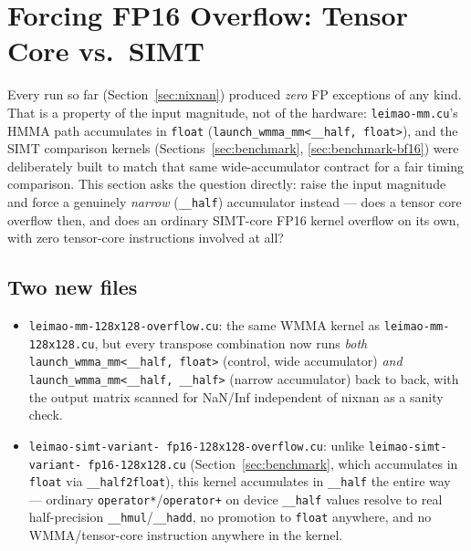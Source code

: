 \documentclass[11pt]{article}
\begin{document}
\section{Forcing FP16 Overflow: Tensor Core vs.\ SIMT}
\label{sec:overflow}

Every run so far (Section~\ref{sec:nixnan}) produced \emph{zero} FP exceptions
of any kind. That is a property of the input magnitude, not of the
hardware: \texttt{leimao-mm.cu}'s HMMA path accumulates in \texttt{float}
(\texttt{launch\_wmma\_mm<\_\_half, float>}), and the SIMT comparison kernels
(Sections~\ref{sec:benchmark}, \ref{sec:benchmark-bf16}) were deliberately
built to match that same wide-accumulator contract for a fair timing
comparison. This section asks the question directly: raise the input
magnitude and force a genuinely \emph{narrow} (\texttt{\_\_half}) accumulator
instead --- does a tensor core overflow then, and does an ordinary SIMT-core
FP16 kernel overflow on its own, with zero tensor-core instructions
involved at all?

\subsection{Two new files}

\begin{itemize}
  \item \texttt{leimao-mm-128x128-overflow.cu}: the same WMMA kernel as
    \texttt{leimao-mm-128x128.cu}, but every transpose combination now runs
    \emph{both} \texttt{launch\_wmma\_mm<\_\_half, float>} (control, wide
    accumulator) \emph{and} \texttt{launch\_wmma\_mm<\_\_half, \_\_half>}
    (narrow accumulator) back to back, with the output matrix scanned for
    NaN/Inf independent of nixnan as a sanity check.
  \item \texttt{leimao-\allowbreak simt-\allowbreak variant-\allowbreak
    fp16-\allowbreak 128x128-\allowbreak overflow.cu}: unlike
    \texttt{leimao-\allowbreak simt-\allowbreak variant-\allowbreak
    fp16-\allowbreak 128x128.cu} (Section~\ref{sec:benchmark},
    which accumulates in \texttt{float} via \texttt{\_\_half2float}), this
    kernel accumulates in \texttt{\_\_half} the entire way --- ordinary
    \texttt{operator*}/\texttt{operator+} on device \texttt{\_\_half} values
    resolve to real half-precision \texttt{\_\_hmul}/\texttt{\_\_hadd}, no
    promotion to \texttt{float} anywhere, and no WMMA/tensor-core
    instruction anywhere in the kernel.
\end{itemize}
\end{document}
